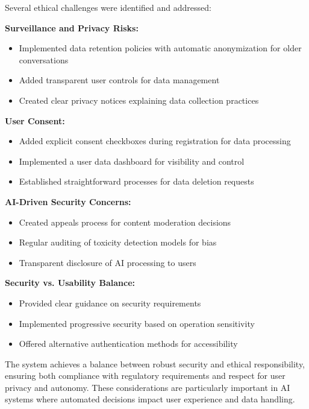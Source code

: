\documentclass{article}
\begin{document}
Several ethical challenges were identified and addressed:

\textbf{Surveillance and Privacy Risks:}

\begin{itemize}
    \item Implemented data retention policies with automatic anonymization for older conversations
    \item Added transparent user controls for data management
    \item Created clear privacy notices explaining data collection practices
\end{itemize}

\textbf{User Consent:}

\begin{itemize}
    \item Added explicit consent checkboxes during registration for data processing
    \item Implemented a user data dashboard for visibility and control
    \item Established straightforward processes for data deletion requests
\end{itemize}

\textbf{AI-Driven Security Concerns:}

\begin{itemize}
    \item Created appeals process for content moderation decisions
    \item Regular auditing of toxicity detection models for bias
    \item Transparent disclosure of AI processing to users
\end{itemize}

\textbf{Security vs. Usability Balance:}

\begin{itemize}
    \item Provided clear guidance on security requirements
    \item Implemented progressive security based on operation sensitivity
    \item Offered alternative authentication methods for accessibility
\end{itemize}

The system achieves a balance between robust security and ethical responsibility, ensuring both compliance with regulatory requirements and respect for user privacy and autonomy. These considerations are particularly important in AI systems where automated decisions impact user experience and data handling.
\end{document}
